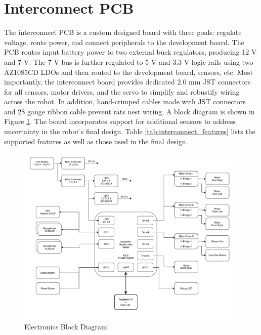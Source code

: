 \section{Interconnect PCB}
The interconnect PCB is a custom designed board with three goals: regulate voltage, route power, and connect peripherals to the development board. The PCB routes input battery power to two external buck regulators, producing 12 V and 7 V. The 7 V bus is further regulated to 5 V and 3.3 V logic rails using two AZ1085CD LDOs and then routed to the development board, sensors, etc. Most importantly, the interconnect board provides dedicated 2.0 mm JST connectors for all sensors, motor drivers, and the servo to simplify and robustify wiring across the robot. In addition, hand-crimped cables made with JST connectors and 28 gauge ribbon cable prevent rats nest wiring. A block diagram is shown in Figure \ref{fig:interconnect_block}. The board incorporates support for additional sensors to address uncertainty in the robot's final design. Table \ref{tab:interconnect_features} lists the supported features as well as those used in the final design. 

\begin{figure}[H]   %
	\centering \includegraphics[width=6in, keepaspectratio]{figures/interconnect_block.pdf}
	\caption{Electronics Block Diagram}\label{fig:interconnect_block}
\end{figure}

